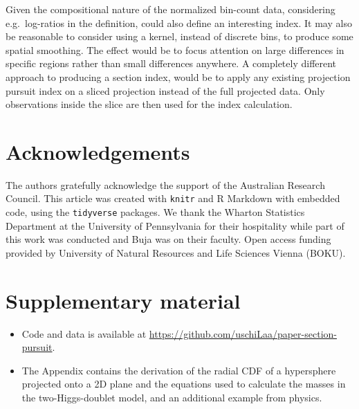 \documentclass[]{interact}
\theoremstyle{plain}%
\theoremstyle{definition}
\theoremstyle{remark}
\def\tightlist{}
\begin{document}
Given the compositional nature of the normalized bin-count data,
considering e.g.~log-ratios in the definition, could also define an
interesting index. It may also be reasonable to consider using a kernel,
instead of discrete bins, to produce some spatial smoothing. The effect
would be to focus attention on large differences in specific regions
rather than small differences anywhere. A completely different approach
to producing a section index, would be to apply any existing projection
pursuit index on a sliced projection instead of the full projected data.
Only observations inside the slice are then used for the index
calculation.

\hypertarget{acknowledgements}{%
\section*{Acknowledgements}\label{acknowledgements}}

The authors gratefully acknowledge the support of the Australian
Research Council. This article was created with \texttt{knitr}
\citep{knitr} and R Markdown \citep{rmarkdown} with embedded code, using
the \texttt{tidyverse} \citep{tidyverse} packages. We thank the Wharton
Statistics Department at the University of Pennsylvania for their
hospitality while part of this work was conducted and Buja was on their
faculty. Open access funding provided by University of Natural Resources
and Life Sciences Vienna (BOKU).

\hypertarget{supplementary-material}{%
\section*{Supplementary material}\label{supplementary-material}}

\begin{itemize}
\tightlist
\item
  Code and data is available at
  \url{https://github.com/uschiLaa/paper-section-pursuit}.
\item
  The Appendix contains the derivation of the radial CDF of a
  hypersphere projected onto a 2D plane and the equations used to
  calculate the masses in the two-Higgs-doublet model, and an additional
  example from physics.
\end{itemize}



\end{document}
